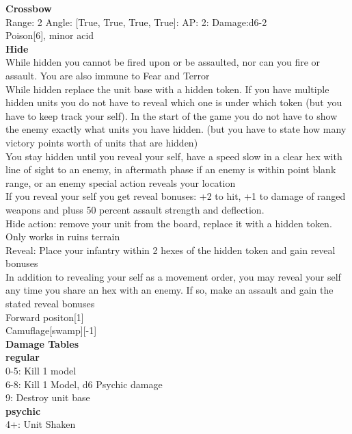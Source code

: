 {\bf Crossbow } \\



Range: 2  Angle: [True, True, True, True]: AP: 2: Damage:d6-2 \\
Poison[6], minor acid\\ 




{\bf Hide } \\

While hidden you cannot be fired upon or be assaulted, nor can you fire or assault. You are also immune to Fear and Terror\\ 
While hidden replace the unit base with a hidden token. If you have multiple hidden units you do not have to reveal which one is under which token (but you have to keep track your self). In the start of the game you do not have to show the enemy exactly what units you have hidden. (but you have to state how many victory points worth of units that are hidden)\\ 
You stay hidden until you reveal your self, have a speed slow in a clear hex with line of sight to an enemy, in aftermath phase if an enemy is within point blank range, or an enemy special action reveals your location\\ 
If you reveal your self you get reveal bonuses: +2 to hit, +1 to damage of ranged weapons and pluss 50 percent assault strength and deflection.\\ 
Hide action: remove your unit from the board, replace it with a hidden token. Only works in ruins terrain\\ 
Reveal: Place your infantry within 2 hexes of the hidden token and gain reveal bonuses\\ 
In addition to revealing your self as a movement order, you may reveal your self any time you share an hex with an enemy. If so, make an assault and gain the stated reveal bonuses\\ 
Forward positon[1]\\ 
Camuflage[swamp][-1]\\ 





 





{\bf Damage Tables} \\
 {\bf regular } \\
0-5: Kill 1 model \\
6-8: Kill 1 Model, d6 Psychic damage \\
9: Destroy unit base \\
 {\bf psychic } \\
4+: Unit Shaken \\




